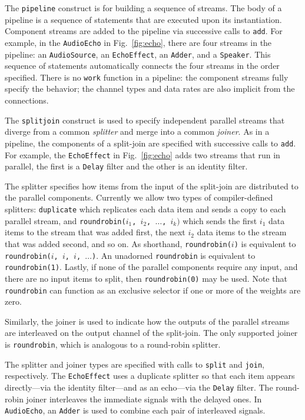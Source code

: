\documentclass[final]{ijpp}
\begin{document}
The \texttt{pipeline} construct is for building a sequence of streams.
The body of  a pipeline is a sequence of  statements that are executed
upon its  instantiation.  Component streams are added  to the pipeline
via   successive  calls   to  \texttt{add}.    For  example,   in  the
\texttt{AudioEcho} in Fig.~\ref{fig:echo}, there are four streams in
the  pipeline:  an  \texttt{AudioSource}, an  \texttt{EchoEffect},  an
\texttt{Adder}, and  a \texttt{Speaker}.  This  sequence of statements
automatically connects the four streams in the order specified.  There
is  no \texttt{work}  function in  a pipeline:  the  component streams
fully specify the behavior; the  channel types and data rates are also
implicit from the connections.

The  \texttt{splitjoin}  construct  is  used  to  specify  independent
parallel streams that diverge  from a common \emph{splitter} and merge
into a  common \emph{joiner}.  As in  a pipeline, the  components of a
split-join are  specified with successive calls  to \texttt{add}.  For
example,  the \texttt{EchoEffect}  in  Fig.~\ref{fig:echo} adds  two
streams that run in parallel, the first is a \texttt{Delay} filter and
the other is an identity filter.

The splitter specifies how items  from the input of the split-join are
distributed to  the parallel components. Currently we  allow two types
of  compiler-defined  splitters:  \texttt{duplicate} which  replicates
each  data  item  and  sends  a  copy to  each  parallel  stream,  and
\texttt{roundrobin($i_1$,  $i_2$,  $\dots$,  $i_k)$} which  sends  the
first $i_1$  data items to the  stream that was added  first, the next
$i_2$ data items  to the stream that was added second,  and so on.  As
shorthand,      \texttt{roundrobin($i$)}     is      equivalent     to
\texttt{roundrobin($i$,    $i$,   $i$,   $\dots$)}.     An   unadorned
\texttt{roundrobin} is  equivalent to \texttt{roundrobin(1)}.  Lastly,
if none of the parallel components require any input, and there are no
input items  to split, then \texttt{roundrobin(0)} may  be used.  Note
that \texttt{roundrobin} can function  as an exclusive selector if one
or more of the weights are zero.

Similarly,  the joiner  is used  to indicate  how the  outputs  of the
parallel  streams  are  interleaved  on  the  output  channel  of  the
split-join.  The  only supported joiner  is \texttt{roundrobin}, which
is analogous to a round-robin splitter.

The   splitter  and  joiner   types  are   specified  with   calls  to
\texttt{split}      and     \texttt{join},      respectively.      The
\texttt{EchoEffect}  uses  a  duplicate  splitter so  that  each  item
appears directly---via the identity  filter---and as an echo---via the
\texttt{Delay}   filter.  The   round-robin  joiner   interleaves  the
immediate signals  with the  delayed ones.  In  \texttt{AudioEcho}, an
\texttt{Adder} is used to combine each pair of interleaved signals.
\end{document}
